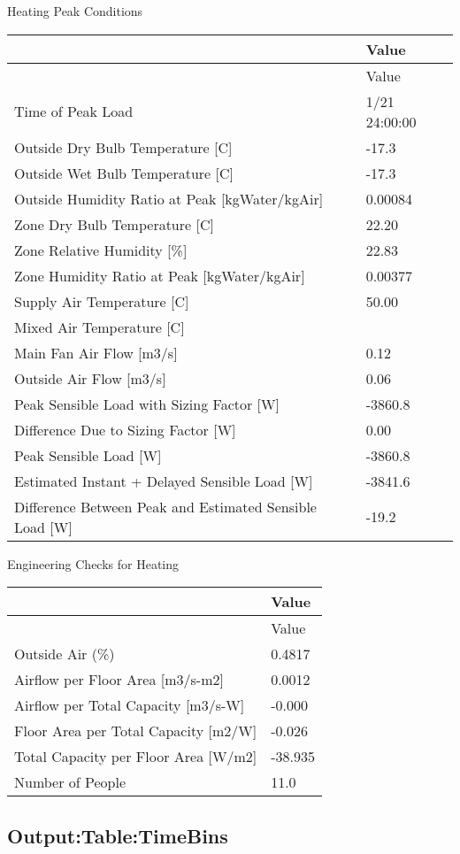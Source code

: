 Heating Peak Conditions

{\scriptsize
\begin{longtable}[c]{@{}ll@{}}
\toprule 
 & Value \tabularnewline
\midrule
\endfirsthead

\toprule 
 & Value \tabularnewline
\midrule
\endhead

Time of Peak Load & 1/21 24:00:00 \tabularnewline
Outside Dry Bulb Temperature {[}C{]} & -17.3 \tabularnewline
Outside Wet Bulb Temperature {[}C{]} & -17.3 \tabularnewline
Outside Humidity Ratio at Peak {[}kgWater/kgAir{]} & 0.00084 \tabularnewline
Zone Dry Bulb Temperature {[}C{]} & 22.20 \tabularnewline
Zone Relative Humidity {[}\%{]} & 22.83 \tabularnewline
Zone Humidity Ratio at Peak {[}kgWater/kgAir{]} & 0.00377 \tabularnewline
Supply Air Temperature {[}C{]} & 50.00 \tabularnewline
Mixed Air Temperature {[}C{]} &  \tabularnewline
Main Fan Air Flow {[}m3/s{]} & 0.12 \tabularnewline
Outside Air Flow {[}m3/s{]} & 0.06 \tabularnewline
Peak Sensible Load with Sizing Factor {[}W{]} & -3860.8 \tabularnewline
Difference Due to Sizing Factor {[}W{]} & 0.00 \tabularnewline
Peak Sensible Load {[}W{]} & -3860.8 \tabularnewline
Estimated Instant + Delayed Sensible Load {[}W{]} & -3841.6 \tabularnewline
Difference Between Peak and Estimated Sensible Load {[}W{]} & -19.2 \tabularnewline

\bottomrule
\end{longtable}}

Engineering Checks for Heating

{\scriptsize
\begin{longtable}[c]{@{}ll@{}}
\toprule 
 & Value \tabularnewline
\midrule
\endfirsthead

\toprule 
 & Value \tabularnewline
\midrule
\endhead

Outside Air (\%) & 0.4817 \tabularnewline
Airflow per Floor Area {[}m3/s-m2{]} & 0.0012 \tabularnewline
Airflow per Total Capacity {[}m3/s-W{]} & -0.000 \tabularnewline
Floor Area per Total Capacity {[}m2/W{]} & -0.026 \tabularnewline
Total Capacity per Floor Area {[}W/m2{]} & -38.935 \tabularnewline
Number of People & 11.0 \tabularnewline

\bottomrule
\end{longtable}}


\subsection{Output:Table:TimeBins}\label{outputtabletimebins}


